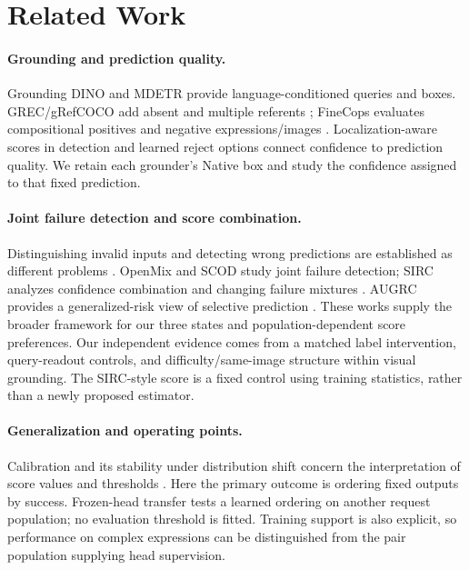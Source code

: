 \documentclass[10pt,twocolumn,letterpaper]{article}
\begin{document}
\section{Related Work}
\paragraph{Grounding and prediction quality.}
Grounding DINO \cite{liu2025groundingdino} and MDETR
\cite{kamath2021mdetr} provide language-conditioned queries and boxes.
GREC/gRefCOCO add absent and multiple referents
\cite{he2023grec,liu2023gres}; FineCops evaluates compositional positives
and negative expressions/images \cite{liu2024finecops}.
Localization-aware scores in detection \cite{li2020gfl} and learned
reject options \cite{geifman2019selectivenet} connect confidence to
prediction quality. We retain each grounder's Native box and study the
confidence assigned to that fixed prediction.

\paragraph{Joint failure detection and score combination.}
Distinguishing invalid inputs and detecting wrong predictions are established
as different problems \cite{jaeger2023failure}. OpenMix
\cite{zhu2023openmix} and SCOD \cite{narasimhan2024scod} study joint
failure detection; SIRC analyzes confidence combination and changing
failure mixtures \cite{xia2024sirc}. AUGRC provides a generalized-risk
view of selective prediction \cite{traub2024augrc}. These works supply
the broader framework for our three states and population-dependent
score preferences. Our independent evidence comes from a matched label
intervention, query-readout controls, and difficulty/same-image structure
within visual grounding. The SIRC-style score is a fixed control using
training statistics, rather than a newly proposed estimator.

\paragraph{Generalization and operating points.}
Calibration and its stability under distribution shift concern the
interpretation of score values and thresholds
\cite{guo2017calibration,ovadia2019trust}. Here the primary outcome is
ordering fixed outputs by success. Frozen-head transfer tests a learned
ordering on another request population; no evaluation threshold is fitted.
Training support is also explicit, so performance on complex expressions
can be distinguished from the pair population supplying head supervision.
\end{document}
